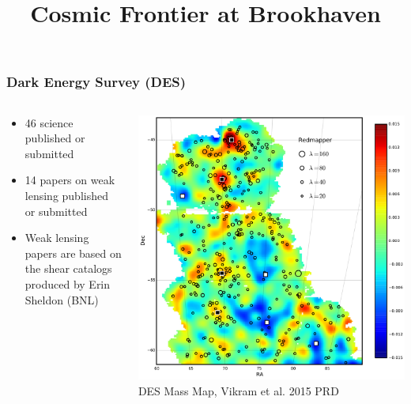 \documentclass{beamer}
\title{Cosmic Frontier at Brookhaven}
\begin{document}

\frame
{

    \frametitle{Dark Energy Survey (DES)}

    \fontsize{9}{0.8\baselineskip}

    \begin{columns}

        \begin{column}{0.5\textwidth}

            \begin{itemize}

                \item 46 science published or submitted

                \item 14 papers on weak lensing published or submitted

                \item Weak lensing papers are based on the shear catalogs produced
                    by Erin Sheldon (BNL)

            \end{itemize}

        \end{column}

        \begin{column}{0.5\textwidth}
            \includegraphics[scale=0.17]{cluster_overlay_ngmix_bpz.pdf}
            \newline
            {\tiny DES Mass Map, Vikram et al. 2015 PRD}
        \end{column}

    \end{columns}

}
\end{document}
